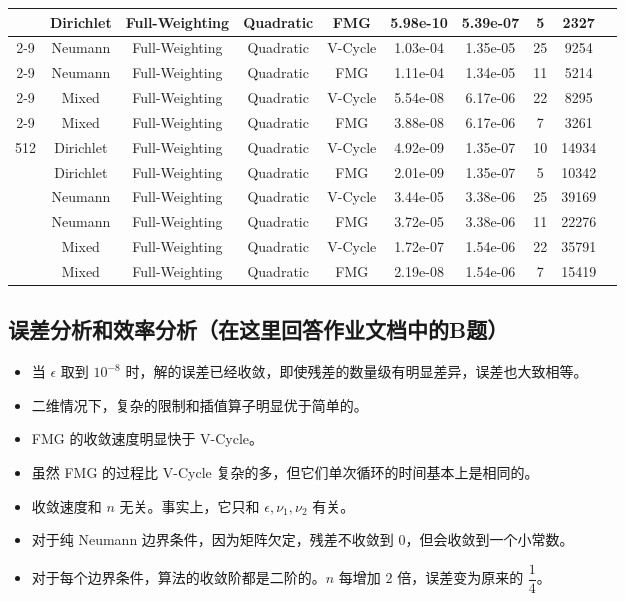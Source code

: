 \documentclass{ctexart}
\begin{document}
\begin{longtable}{cccccccccc}
\multirow{6}{*}{}		& Dirichlet	& Full-Weighting	& Quadratic	& FMG		& 5.98e-10	& 5.39e-07	& 5		& 2327		\\ \cline{2-9}
\multirow{6}{*}{}		& Neumann	& Full-Weighting	& Quadratic	& V-Cycle	& 1.03e-04	& 1.35e-05	& 25	& 9254		\\ \cline{2-9}
\multirow{6}{*}{}		& Neumann	& Full-Weighting	& Quadratic	& FMG		& 1.11e-04	& 1.34e-05	& 11	& 5214		\\ \cline{2-9}
\multirow{6}{*}{}		& Mixed		& Full-Weighting	& Quadratic	& V-Cycle	& 5.54e-08	& 6.17e-06	& 22	& 8295		\\ \cline{2-9}
\multirow{6}{*}{}		& Mixed		& Full-Weighting	& Quadratic	& FMG		& 3.88e-08	& 6.17e-06	& 7		& 3261		\\ \hline
\multirow{6}{*}{512}	& Dirichlet	& Full-Weighting	& Quadratic	& V-Cycle	& 4.92e-09	& 1.35e-07	& 10	& 14934		\\ \cline{2-9}
\multirow{6}{*}{}		& Dirichlet	& Full-Weighting	& Quadratic	& FMG		& 2.01e-09	& 1.35e-07	& 5		& 10342		\\ \cline{2-9}
\multirow{6}{*}{}		& Neumann	& Full-Weighting	& Quadratic	& V-Cycle	& 3.44e-05	& 3.38e-06	& 25	& 39169		\\ \cline{2-9}
\multirow{6}{*}{}		& Neumann	& Full-Weighting	& Quadratic	& FMG		& 3.72e-05	& 3.38e-06	& 11	& 22276		\\ \cline{2-9}
\multirow{6}{*}{}		& Mixed		& Full-Weighting	& Quadratic	& V-Cycle	& 1.72e-07	& 1.54e-06	& 22	& 35791		\\ \cline{2-9}
\multirow{6}{*}{}		& Mixed		& Full-Weighting	& Quadratic	& FMG		& 2.19e-08	& 1.54e-06	& 7		& 15419		\\ \hline
\end{longtable}

\subsection{误差分析和效率分析（在这里回答作业文档中的B题）}

\begin{itemize}
	\item 当 $\epsilon$ 取到 $10^{-8}$ 时，解的误差已经收敛，即使残差的数量级有明显差异，误差也大致相等。
	\item 二维情况下，复杂的限制和插值算子明显优于简单的。
	\item FMG 的收敛速度明显快于 V-Cycle。
	\item 虽然 FMG 的过程比 V-Cycle 复杂的多，但它们单次循环的时间基本上是相同的。
	\item 收敛速度和 $n$ 无关。事实上，它只和 $\epsilon,\nu_1,\nu_2$ 有关。
	\item 对于纯 Neumann 边界条件，因为矩阵欠定，残差不收敛到 $0$，但会收敛到一个小常数。
	\item 对于每个边界条件，算法的收敛阶都是二阶的。$n$ 每增加 $2$ 倍，误差变为原来的 $\dfrac 14$。
\end{itemize}
\end{document}
